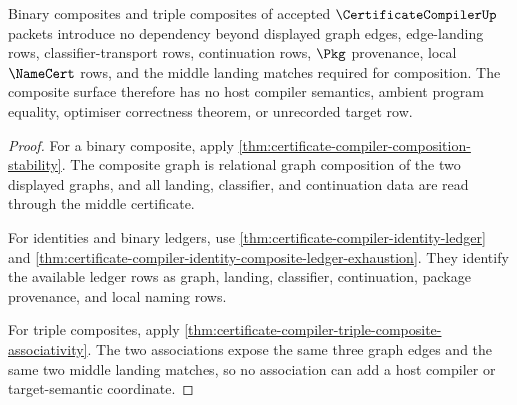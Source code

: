 \begin{theorem}
\label{thm:certificate-compiler-composite-scope}
Binary composites and triple composites of accepted $\CertificateCompilerUp$
packets introduce no dependency beyond displayed graph edges, edge-landing
rows, classifier-transport rows, continuation rows, $\Pkg$ provenance, local
$\NameCert$ rows, and the middle landing matches required for composition.
The composite surface therefore has no host compiler semantics, ambient
program equality, optimiser correctness theorem, or unrecorded target row.
\end{theorem}
\begin{proof}
For a binary composite, apply
\autoref{thm:certificate-compiler-composition-stability}. The composite graph
is relational graph composition of the two displayed graphs, and all landing,
classifier, and continuation data are read through the middle certificate.

For identities and binary ledgers, use
\autoref{thm:certificate-compiler-identity-ledger} and
\autoref{thm:certificate-compiler-identity-composite-ledger-exhaustion}. They
identify the available ledger rows as graph, landing, classifier,
continuation, package provenance, and local naming rows.

For triple composites, apply
\autoref{thm:certificate-compiler-triple-composite-associativity}. The two
associations expose the same three graph edges and the same two middle
landing matches, so no association can add a host compiler or target-semantic
coordinate.
\end{proof}

